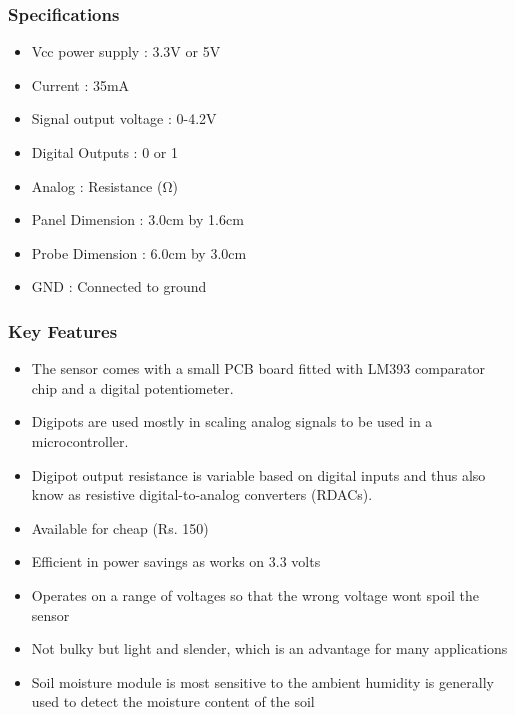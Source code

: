 \documentclass[16pt]{article}
\begin{document}
\vspace{0.5cm}

\subsubsection{Specifications}

\begin{itemize}

\item
  Vcc power supply : 3.3V or 5V
\item
  Current : 35mA
\item
  Signal output voltage : 0-4.2V
\item
  Digital Outputs : 0 or 1
\item
  Analog : Resistance (Ω)
\item
  Panel Dimension : 3.0cm by 1.6cm
\item
  Probe Dimension : 6.0cm by 3.0cm
\item
  GND : Connected to ground
\end{itemize}



\vspace{0.5cm}
\subsubsection{Key Features}

\begin{itemize}

\item
  The sensor comes with a small PCB board fitted with LM393 comparator
  chip and a digital potentiometer.
\item
  Digipots are used mostly in scaling analog signals to be used in a
  microcontroller.
\item
  Digipot output resistance is variable based on digital inputs and thus
  also know as resistive digital-to-analog converters (RDACs).
\item
  Available for cheap (Rs. 150)
\item
  Efficient in power savings as works on 3.3 volts
\item
  Operates on a range of voltages so that the wrong voltage wont spoil
  the sensor
\item
  Not bulky but light and slender, which is an advantage for many
  applications
\item
  Soil moisture module is most sensitive to the ambient humidity is
  generally used to detect the \vspace{0.5cm}moisture content of the soil
\end{itemize}
\end{document}
